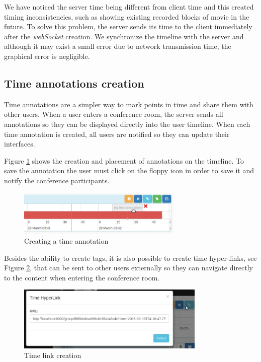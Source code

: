 	We have noticed the server time being different from client time and this created timing inconsistencies, such as showing existing recorded blocks of movie in the future. To solve this problem, the server sends its time to the client immediately after the \emph{webSocket} creation. We synchronize the timeline with the server and although it may exist a small error due to network transmission time, the graphical error is negligible. 


	\subsection{Time annotations creation}

	Time annotations are a simpler way to mark points in time and share them with other users. When a user enters a conference room, the server sends all annotations so they can be displayed directly into the user timeline. When each time annotation is created, all users are notified so they can update their interfaces.

	Figure \ref{fig:annotation} shows the creation and placement of annotations on the timeline. To save the annotation the user must click on the floppy icon in order to save it and notify the conference participants. 

	\begin{figure}
		\centering
		\includegraphics[width=0.7\textwidth]{figures/annotation.png}
		\caption{Creating a time annotation}
		\label{fig:annotation}
	\end{figure}

	Besides the ability to create tags, it is also possible to create time hyper-links, see Figure \ref{fig:timelink}, that can be sent to other users externally so they can navigate directly to the content when entering the conference room.


	\begin{figure}
		\centering
		\includegraphics[width=0.8\textwidth]{figures/timelink.png}
		\caption{Time link creation}
		\label{fig:timelink}
	\end{figure}


